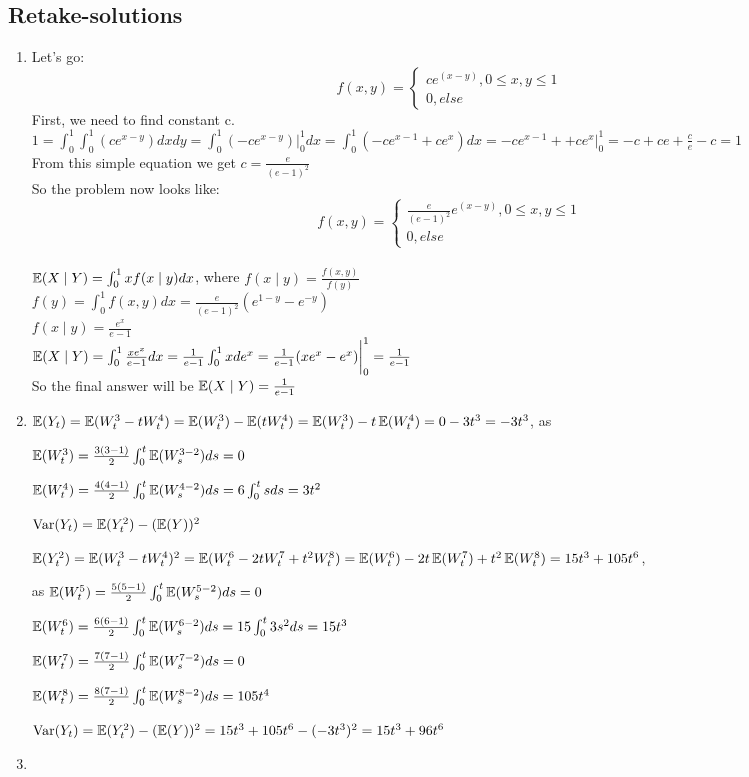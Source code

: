 \documentclass[12pt, a4paper]{article}
\begin{document}
\subsection{Retake-solutions}
\begin{enumerate}
\item Let's go:
\[
f(x,y)=
   \begin{cases}
   ce^{(x-y)}, 0  \leq  x,y  \leq  1\\
   0, else
      \end{cases}
\]
First, we need to find constant c.\\
$ 1=\int_0^{1} \int_0^{1} (ce^{x-y})dxdy=\int_0^{1}(-ce^{x-y})\bigg|_0^1dx=\int_0^{1}(-ce^{x-1}+ce^x)dx=-ce^{x-1}++ce^x\bigg|_0^1=-c+ce+\frac{c}{e}-c=1$\\
From this simple equation we get $c=\frac{e}{(e-1)^2}$\\
So the problem now looks like:
\[
f(x,y)=
\begin{cases}
   \frac{e}{(e-1)^2}e^{(x-y)}, 0  \leq  x,y  \leq  1\\
   0, else
\end{cases}
\]\\
$\operatorname{\mathbb{E}}(X \mid Y)=\int_0^{1}xf(x \mid y)dx$, where $f(x \mid y)=\frac{f(x,y)}{f(y)}$\\
$f(y)=\int_0^{1}f(x,y)dx=\frac{e}{(e-1)^2}(e^{1-y}-e^{-y})$\\
$f(x \mid y)=\frac{e^x}{e-1}$\\
$\operatorname{\mathbb{E}}(X \mid Y)=\int_0^{1}\frac{xe^x}{e-1}dx=\frac{1}{e-1}\int_0^{1}xde^x=\frac{1}{e-1}(xe^x-e^x)\bigg|_0^1=\frac{1}{e-1}$\\
So the final answer will be $\operatorname{\mathbb{E}}(X \mid Y)=\frac{1}{e-1}$

\item $\operatorname{\mathbb{E}}(Y_t)=\operatorname{\mathbb{E}}(W^3_t-tW^4_t) = \operatorname{\mathbb{E}}(W^3_t)-\operatorname{\mathbb{E}}(tW^4_t) = \operatorname{\mathbb{E}}(W^3_t)-t \operatorname{\mathbb{E}}(W^4_t)= 0 - 3t^3 = - 3t^3 $, as

$\operatorname{\mathbb{E}}(W^{3}_{t})= \frac{3(3-1)}{2} \int_0^{t} \operatorname{\mathbb{E}} (W^{3-2}_{s}) ds = 0 $

$\operatorname{\mathbb{E}}(W^{4}_{t})= \frac{4(4-1)}{2} \int_0^{t} \operatorname{\mathbb{E}} (W^{4-2}_{s}) ds = 6 \int_0^{t} s ds =3 t^2 $

$\operatorname{Var}(Y_t) =\operatorname{\mathbb{E}}(Y^2_t)-(\operatorname{\mathbb{E}}(Y))^2$

$\operatorname{\mathbb{E}}(Y^2_t)=\operatorname{\mathbb{E}}(W^3_t-tW^4_t)^2=\operatorname{\mathbb{E}}(W^6_t-2tW^7_t+t^2 W^8_t)= \operatorname{\mathbb{E}}(W^6_t)-2t\operatorname{\mathbb{E}}(W^7_t)+t^2 \operatorname{\mathbb{E}}(W^8_t) = 15t^3 + 105t^6$,

as $\operatorname{\mathbb{E}}(W^{5}_{t})= \frac{5(5-1)}{2} \int_0^{t} \operatorname{\mathbb{E}} (W^{5-2}_{s}) ds = 0 $

$\operatorname{\mathbb{E}}(W^{6}_{t})= \frac{6(6-1)}{2} \int_0^{t} \operatorname{\mathbb{E}} (W^{6-2}_{s}) ds = 15 \int_0^{t} 3s^2 ds= 15t^3 $

$\operatorname{\mathbb{E}}(W^{7}_{t})= \frac{7(7-1)}{2} \int_0^{t} \operatorname{\mathbb{E}} (W^{7-2}_{s}) ds = 0 $

$\operatorname{\mathbb{E}}(W^{8}_{t})= \frac{8(7-1)}{2} \int_0^{t} \operatorname{\mathbb{E}} (W^{8-2}_{s}) ds = 105t^4 $

$\operatorname{Var}(Y_t) =\operatorname{\mathbb{E}}(Y^2_t)-(\operatorname{\mathbb{E}}(Y))^2 = 15t^3 + 105t^6 - (-3t^3)^2= 15t^3 + 96 t^6$

\item
\end{enumerate}
\end{document}
